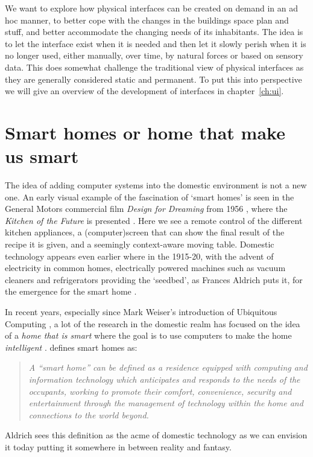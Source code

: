 We want to explore how physical interfaces can be created on demand in an ad hoc manner, to better cope with the changes in the buildings space plan and stuff, and better accommodate the changing needs of its inhabitants.
The idea is to let the interface exist when it is needed and then let it slowly perish when it is no longer used, either manually, over time, by natural forces or based on sensory data.
This does somewhat challenge the traditional view of physical interfaces as they are generally considered static and permanent.
To put this into perspective we will give an overview of the development of interfaces in chapter~\ref{ch:ui}.

\section{Smart homes or home that make us smart}
The idea of adding computer systems into the domestic environment is not a new one. An early visual example of the fascination of `smart homes' is seen in the General Motors commercial film \emph{Design for Dreaming} from 1956 \citep{designfordreaming,designfordreamingWIKIPEDIA}, where the \emph{Kitchen of the Future} is presented \citep{homeofthefutureWIKIPEDIA}.
Here we see a remote control of the different kitchen appliances, a (computer)screen that can show the final result of the recipe it is given, and a seemingly context-aware moving table.
Domestic technology appears even earlier where in the 1915-20, with the advent of electricity in common homes, electrically powered machines such as vacuum cleaners and refrigerators providing the `seedbed', as Frances Aldrich puts it, for the emergence for the smart home \citep{aldrich2003smart}.

In recent years, especially since Mark Weiser's introduction of Ubiquitous Computing \citep{weiser1991computer}, a lot of the research in the domestic realm has focused on the idea of a \emph{home that is smart} where the goal is to use computers to make the home \emph{intelligent} \citep{taylor2007homes}.
\citet{aldrich2003smart} defines smart homes as:

\begin{quotation}
\emph{A ``smart home'' can be defined as a residence equipped with computing and information technology which anticipates and responds to the needs of the occupants, working to promote their comfort, convenience, security and entertainment through the management of technology within the home and connections to the world beyond.}
\end{quotation}
Aldrich sees this definition as the acme of domestic technology as we can envision it today putting it somewhere in between reality and fantasy.

